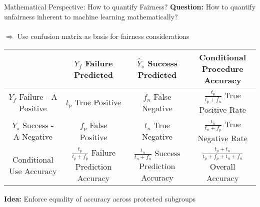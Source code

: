\begin{frame}{Mathematical Perspective: How to quantify Fairness? \cite{Berk.2018}}
    \textbf{Question:} How to quantify unfairness inherent to machine learning mathematically? \\~\\
    $\Rightarrow$ Use confusion matrix as basis for fairness considerations
    \begin{table}[h]
    \label{tab:confusion}
    \centering
    \begin{tabular}{ c|c|c|c } 
    \toprule
      & \thead{$\hat{Y}_f$ \\ Failure Predicted} & \thead{$\hat{Y}_s$ \\ Success Predicted} & \thead{Conditional Procedure \\ Accuracy} \\ 
    \hline
    \thead{$Y_f$ \\ Failure - A Positive} & \makecell{$t_p$ \\ True Positive} & \makecell{$f_n$ \\ False Negative} & \makecell{$\frac{t_p}{t_p + f_n}$ \\ True Positive Rate} \\ 
    \hline
    \thead{$Y_s$ \\ Success - A Negative} & \makecell{$f_p$ \\ False Positive} & \makecell{$t_n$ \\ True Negative} & \makecell{$\frac{t_n}{t_n + f_p}$ \\ True Negative Rate } \\ 
    \hline
    \thead{Conditional \\ Use Accuracy} & \makecell{$\frac{t_p}{t_p + f_p}$ \\ Failure Prediction Accuracy} & \makecell{$\frac{t_n}{t_n + f_n}$ \\ Success Prediction Accuracy} & \makecell{$\frac{t_p + t_n}{t_p + f_p + t_n + f_n}$ \\ Overall Accuracy} \\ 
    \bottomrule
    \end{tabular}
    \end{table}
    
    \textbf{Idea:} Enforce equality of accuracy across protected subgroups
\end{frame}

